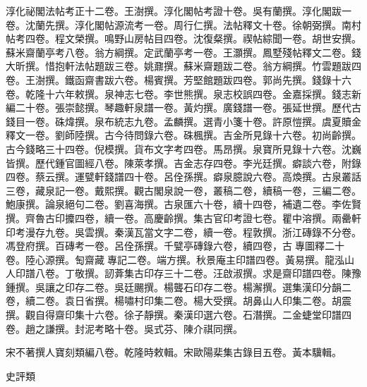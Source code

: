 \begin{pinyinscope}
淳化祕閣法帖考正十二卷。王澍撰。淳化閣帖考證十卷。吳有蘭撰。淳化閣跋一卷。沈蘭先撰。淳化閣帖源流考一卷。周行仁撰。法帖釋文十卷。徐朝弼撰。南村帖考四卷。程文榮撰。鳴野山房帖目四卷。沈復粲撰。禊帖綜聞一卷。胡世安撰。蘇米齋蘭亭考八卷。翁方綱撰。定武蘭亭考一卷。王灝撰。鳳墅殘帖釋文二卷。錢大昕撰。惜抱軒法帖題跋三卷。姚鼐撰。蘇米齋題跋二卷。翁方綱撰。竹雲題跋四卷。王澍撰。鐵函齋書跋六卷。楊賓撰。芳堅館題跋四卷。郭尚先撰。錢錄十六卷。乾隆十六年敕撰。泉神志七卷。李世熊撰。泉志校誤四卷。金嘉採撰。錢志新編二十卷。張崇懿撰。琴趣軒泉譜一卷。黃灼撰。廣錢譜一卷。張延世撰。歷代古錢目一卷。硃煒撰。泉布統志九卷。孟麟撰。選青小箋十卷。許原愷撰。虞夏贖金釋文一卷。劉師陸撰。古今待問錄六卷。硃楓撰。吉金所見錄十六卷。初尚齡撰。古今錢略三十四卷。倪模撰。貨布文字考四卷。馬昂撰。泉寶所見錄十六卷。沈巍皆撰。歷代鍾官圖經八卷。陳萊孝撰。吉金志存四卷。李光廷撰。癖談六卷，附錄四卷。蔡云撰。運甓軒錢譜四十卷。呂佺孫撰。癖泉臆說六卷。高煥撰。古泉叢話三卷，藏泉記一卷。戴熙撰。觀古閣泉說一卷，叢稿二卷，續稿一卷，三編二卷。鮑康撰。論泉絕句二卷。劉喜海撰。古泉匯六十卷，續十四卷，補遺二卷。李佐賢撰。齊魯古印攗四卷，續一卷。高慶齡撰。集古官印考證七卷。瞿中溶撰。兩罍軒印考漫存九卷。吳雲撰。秦漢瓦當文字二卷，續一卷。程敦撰。浙江磚錄不分卷。馮登府撰。百磚考一卷。呂佺孫撰。千甓亭磚錄六卷，續四卷，古專圖釋二十卷。陸心源撰。匋齋藏專記二卷。端方撰。秋景庵主印譜四卷。黃易撰。龍泓山人印譜八卷。丁敬撰。訒葊集古印存三十二卷。汪啟淑撰。求是齋印譜四卷。陳豫鍾撰。吳讓之印存二卷。吳廷颺撰。楊聾石印存二卷。楊澥撰。選集漢印分韻二卷，續二卷。袁日省撰。楊嘯村印集二卷。楊大受撰。胡鼻山人印集二卷。胡震撰。觀自得齋印集十六卷。徐子靜撰。秦漢印選六卷。石潛撰。二金蜨堂印譜四卷。趙之謙撰。封泥考略十卷。吳式芬、陳介祺同撰。

宋不著撰人寶刻類編八卷。乾隆時敕輯。宋歐陽棐集古錄目五卷。黃本驥輯。

史評類


\end{pinyinscope}
